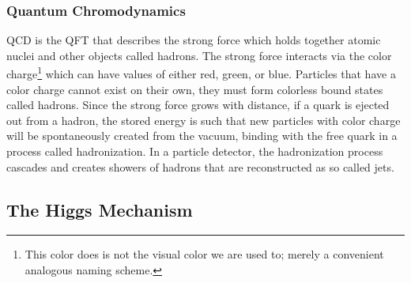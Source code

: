 
		\subsubsection{Quantum Chromodynamics}\label{sssec:QCD}
		
			\acrfull{QCD} is the \gls{QFT} that describes the strong force which holds together atomic nuclei and other objects called hadrons. The strong force interacts via the color charge\footnote{This color does is not the visual color we are used to; merely a convenient analogous naming scheme.} which can have values of either red, green, or blue. Particles that have a color charge cannot exist on their own, they must form colorless bound states called hadrons. Since the strong force grows with distance, if a quark is ejected out from a hadron, the stored energy is such that new particles with color charge will be spontaneously created from the vacuum, binding with the free quark in a process called hadronization. In a particle detector, the hadronization process cascades and creates showers of hadrons that are reconstructed as so called jets.

	\subsection{The Higgs Mechanism}\label{ssec:Higgs}

